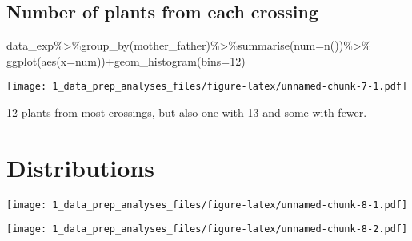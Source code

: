 \documentclass[
]{article}
\newenvironment{Shaded}{\begin{snugshade}}{\end{snugshade}}
\newcommand{\AttributeTok}[1]{\textcolor[rgb]{0.77,0.63,0.00}{#1}}
\newcommand{\DecValTok}[1]{\textcolor[rgb]{0.00,0.00,0.81}{#1}}
\newcommand{\FunctionTok}[1]{\textcolor[rgb]{0.00,0.00,0.00}{#1}}
\newcommand{\NormalTok}[1]{#1}
\newcommand{\SpecialCharTok}[1]{\textcolor[rgb]{0.00,0.00,0.00}{#1}}
\begin{document}
\hypertarget{number-of-plants-from-each-crossing}{%
\subsection{Number of plants from each
crossing}\label{number-of-plants-from-each-crossing}}

\begin{Shaded}
\begin{Highlighting}[]
\NormalTok{data\_exp}\SpecialCharTok{\%\textgreater{}\%}\FunctionTok{group\_by}\NormalTok{(mother\_father)}\SpecialCharTok{\%\textgreater{}\%}\FunctionTok{summarise}\NormalTok{(}\AttributeTok{num=}\FunctionTok{n}\NormalTok{())}\SpecialCharTok{\%\textgreater{}\%}
  \FunctionTok{ggplot}\NormalTok{(}\FunctionTok{aes}\NormalTok{(}\AttributeTok{x=}\NormalTok{num))}\SpecialCharTok{+}\FunctionTok{geom\_histogram}\NormalTok{(}\AttributeTok{bins=}\DecValTok{12}\NormalTok{)}
\end{Highlighting}
\end{Shaded}

\texttt{[image: 1\_data\_prep\_analyses\_files/figure-latex/unnamed-chunk-7-1.pdf]}

12 plants from most crossings, but also one with 13 and some with fewer.

\hypertarget{distributions}{%
\section{Distributions}\label{distributions}}

\begin{Shaded}
\end{Shaded}

\texttt{[image: 1\_data\_prep\_analyses\_files/figure-latex/unnamed-chunk-8-1.pdf]}

\begin{Shaded}
\end{Shaded}

\texttt{[image: 1\_data\_prep\_analyses\_files/figure-latex/unnamed-chunk-8-2.pdf]}

\begin{Shaded}
\end{Shaded}
\end{document}
